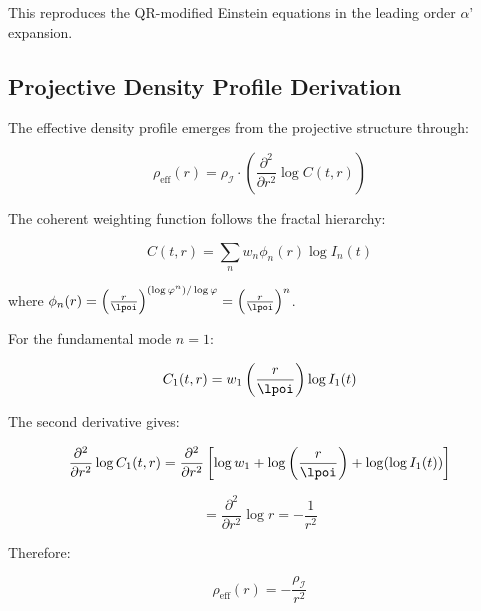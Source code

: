This reproduces the QR-modified Einstein equations in the leading order $\alpha’$ expansion.

\subsection{Projective Density Profile Derivation}
\label{subsec:projective-density-derivation}

The effective density profile emerges from the projective structure through:

\begin{equation}
\rho_{\text{eff}}(r) = \rho_{\mathcal{I}} \cdot \left(\frac{\partial^2}{\partial r^2} \log C(t,r)\right)
\label{eq:projective-density-formula}
\end{equation}

The coherent weighting function follows the fractal hierarchy:

\begin{equation}
C(t,r) = \sum_n w_n \phi_n(r) \log I_n(t)
\label{eq:coherent-weighting-detailed}
\end{equation}

where $\phi_n(r) = \left(\frac{r}{\lpoi}\right)^{(\log \varphi^n)/\log \varphi} = \left(\frac{r}{\lpoi}\right)^n$.

For the fundamental mode $n=1$:

\begin{equation}
C_1(t,r) = w_1 \left(\frac{r}{\lpoi}\right) \log I_1(t)
\label{eq:fundamental-mode}
\end{equation}

The second derivative gives:

\begin{equation}
\frac{\partial^2}{\partial r^2} \log C_1(t,r) = \frac{\partial^2}{\partial r^2} \left[ \log w_1 + \log\left(\frac{r}{\lpoi}\right) + \log(\log I_1(t)) \right]
\label{eq:second-derivative-step1}
\end{equation}

\begin{equation}
= \frac{\partial^2}{\partial r^2} \log r = -\frac{1}{r^2}
\label{eq:second-derivative-result}
\end{equation}

Therefore:

\begin{equation}
\rho_{\text{eff}}(r) = -\frac{\rho_{\mathcal{I}}}{r^2}
\label{eq:effective-density-fundamental}
\end{equation}


